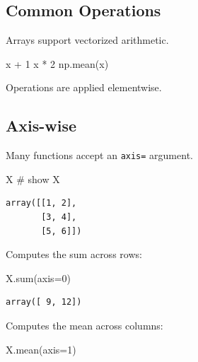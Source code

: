 \documentclass[
  letterpaper,
  DIV=11,
  numbers=noendperiod]{scrreprt}
\newenvironment{Shaded}{\begin{snugshade}}{\end{snugshade}}
\newcommand{\BuiltInTok}[1]{\textcolor[rgb]{0.00,0.23,0.31}{#1}}
\newcommand{\CommentTok}[1]{\textcolor[rgb]{0.37,0.37,0.37}{#1}}
\newcommand{\DecValTok}[1]{\textcolor[rgb]{0.68,0.00,0.00}{#1}}
\newcommand{\NormalTok}[1]{\textcolor[rgb]{0.00,0.23,0.31}{#1}}
\newcommand{\OperatorTok}[1]{\textcolor[rgb]{0.37,0.37,0.37}{#1}}
\theoremstyle{definition}
\theoremstyle{definition}
\theoremstyle{plain}
\theoremstyle{plain}
\theoremstyle{remark}
\begin{document}
\subsection{Common Operations}\label{common-operations}

Arrays support vectorized arithmetic.

\begin{Shaded}
\begin{Highlighting}[]
\NormalTok{x }\OperatorTok{+} \DecValTok{1}
\NormalTok{x }\OperatorTok{*} \DecValTok{2}
\NormalTok{np.mean(x)}
\end{Highlighting}
\end{Shaded}

Operations are applied elementwise.

\subsection{Axis-wise}\label{axis-wise}

Many functions accept an \texttt{axis=} argument.

\begin{Shaded}
\begin{Highlighting}[]
\NormalTok{X              }\CommentTok{\# show X}
\end{Highlighting}
\end{Shaded}

\begin{verbatim}
array([[1, 2],
       [3, 4],
       [5, 6]])
\end{verbatim}

Computes the sum across rows:

\begin{Shaded}
\begin{Highlighting}[]
\NormalTok{X.}\BuiltInTok{sum}\NormalTok{(axis}\OperatorTok{=}\DecValTok{0}\NormalTok{)}
\end{Highlighting}
\end{Shaded}

\begin{verbatim}
array([ 9, 12])
\end{verbatim}

Computes the mean across columns:

\begin{Shaded}
\begin{Highlighting}[]
\NormalTok{X.mean(axis}\OperatorTok{=}\DecValTok{1}\NormalTok{)}
\end{Highlighting}
\end{Shaded}
\end{document}
